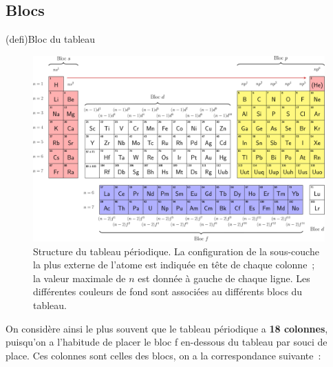 \documentclass[../../main/main.tex]{subfiles}
\begin{document}
\subsection{Blocs}

\begin{tcb*}(defi){Bloc du tableau}
\end{tcb*}

\begin{figure}[htbp]
	\centering
	\includegraphics[width=\linewidth]{tab_per}
	\caption{Structure du tableau périodique. La configuration de la sous-couche
		la plus externe de l'atome est indiquée en tête de chaque colonne~; la
		valeur maximale de $n$ est donnée à gauche de chaque ligne. Les différentes
		couleurs de fond sont associées au différents blocs du tableau.}
	\label{fig:tabper}
\end{figure}

On considère ainsi le plus souvent que le tableau périodique a \textbf{18
	colonnes}, puisqu'on a l'habitude de placer le bloc f en-dessous du tableau par
souci de place. Ces colonnes sont celles des blocs, on a la correspondance
suivante~:
\end{document}
